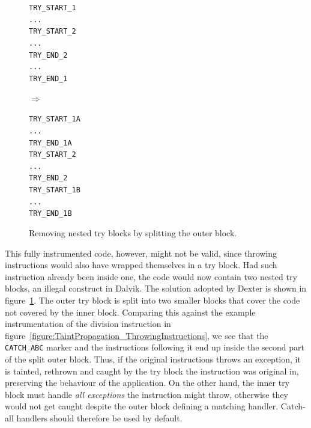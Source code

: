 \documentclass[12pt,twoside,notitlepage]{report}
\newcommand{\asm}[1] {\texttt{#1}}
\begin{document}
\begin{figure}
	\centering
	\begin{minipage}{0.140\textwidth}
	\begin{footnotesize}
		\asm{TRY\_START\_1} \\
		\asm{...} \\
		\asm{TRY\_START\_2} \\
		\asm{...} \\
		\asm{TRY\_END\_2} \\
		\asm{...} \\
		\asm{TRY\_END\_1}
	\end{footnotesize}
	\end{minipage}
	\begin{minipage}{0.09\textwidth}
	\centering
	$\Rightarrow$
	\end{minipage}
	\begin{minipage}{0.150\textwidth}
	\begin{footnotesize}
		\asm{TRY\_START\_1A} \\
		\asm{...} \\
		\asm{TRY\_END\_1A} \\
		\asm{TRY\_START\_2} \\
		\asm{...} \\
		\asm{TRY\_END\_2} \\
		\asm{TRY\_START\_1B} \\
		\asm{...} \\
		\asm{TRY\_END\_1B}
	\end{footnotesize}
	\end{minipage}
	\caption{Removing nested try blocks by splitting the outer block.}
	\label{figure:Instrumentation_TryBlockSplitting}
\end{figure}

This fully instrumented code, however, might not be valid, since throwing instructions would also have wrapped themselves in a try block. Had such instruction already been inside one, the code would now contain two nested try blocks, an illegal construct in Dalvik. The solution adopted by Dexter is shown in figure~\ref{figure:Instrumentation_TryBlockSplitting}. The outer try block is split into two smaller blocks that cover the code not covered by the inner block. Comparing this against the example instrumentation of the division instruction in figure~\ref{figure:TaintPropagation_ThrowingInstructions}, we see that the \verb$CATCH_ABC$ marker and the instructions following it end up inside the second part of the split outer block. Thus, if the original instructions throws an exception, it is tainted, rethrown and caught by the try block the instruction was original in, preserving the behaviour of the application. On the other hand, the inner try block must handle \emph{all exceptions} the instruction might throw, otherwise they would not get caught despite the outer block defining a matching handler. Catch-all handlers should therefore be used by default.
\end{document}

